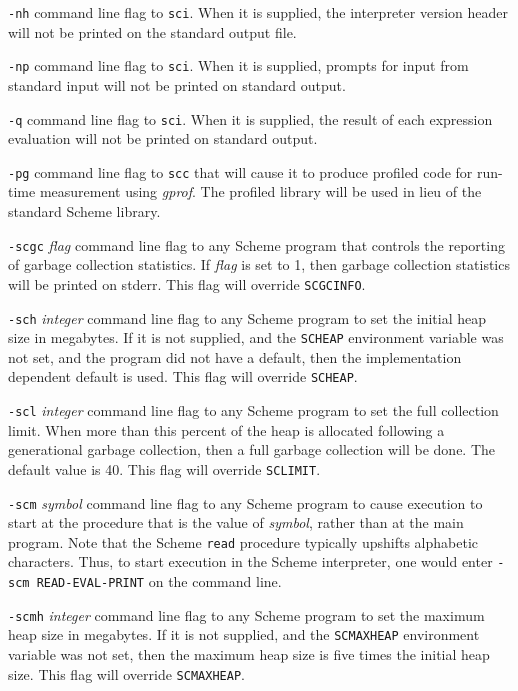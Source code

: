 \documentclass[10pt,twocolumn]{article}
\begin{document}
\texttt{-nh} command line flag to \texttt{sci}.  When it is supplied, the
interpreter version header will not be printed on the standard output
file.

\texttt{-np} command line flag to \texttt{sci}.  When it is supplied, prompts
for input from standard input will not be printed on standard output.

\texttt{-q} command line flag to \texttt{sci}.  When it is supplied, the result
of each expression evaluation will not be printed on standard output.

\texttt{-pg} command line flag to \texttt{scc} that will cause it to produce
profiled code for run-time measurement using \emph{gprof}.  The profiled
library will be used in lieu of the standard Scheme library.

\texttt{-scgc} \emph{flag} command line flag to any Scheme program that
controls the reporting of garbage collection statistics.  If \emph{flag}
is set to 1, then garbage collection statistics will be printed on
stderr.  This flag will override \texttt{SCGCINFO}.

\texttt{-sch} \emph{integer} command line flag to any Scheme program to set
the initial heap size in megabytes.  If it is not supplied, and the
\texttt{SCHEAP} environment variable was not set, and the program did not
have a default, then the implementation dependent default is used.
This flag will override \texttt{SCHEAP}.

\texttt{-scl} \emph{integer} command line flag to any Scheme program to set
the full collection limit.  When more than this percent of the heap
is allocated following a generational garbage collection, then a full
garbage collection will be done.  The default value is 40.  This flag
will override \texttt{SCLIMIT}.

\texttt{-scm} \emph{symbol} command line flag to any Scheme program to cause
execution to start at the procedure that is the value of \emph{symbol},
rather than at the main program.  Note that the Scheme \texttt{read}
procedure typically upshifts alphabetic characters.  Thus, to start
execution in the Scheme interpreter, one would enter \texttt{-scm
READ-EVAL-PRINT} on the command line.

\texttt{-scmh} \emph{integer} command line flag to any Scheme program to set
the maximum heap size in megabytes.  If it is not supplied, and the
\texttt{SCMAXHEAP} environment variable was not set, then the maximum heap
size is five times the initial heap size. This flag will override
\texttt{SCMAXHEAP}.
\end{document}
